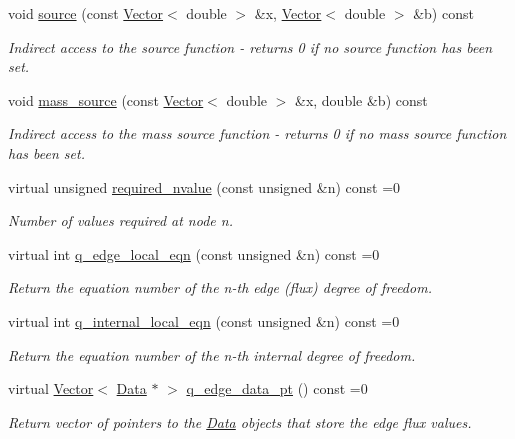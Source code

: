 \begin{DoxyCompactItemize}
void \hyperlink{classoomph_1_1DarcyEquations_aca046624f129486cc4ced6a2c056a53c}{source} (const \hyperlink{classoomph_1_1Vector}{Vector}$<$ double $>$ \&x, \hyperlink{classoomph_1_1Vector}{Vector}$<$ double $>$ \&b) const
\begin{DoxyCompactList}\small\item\em Indirect access to the source function -\/ returns 0 if no source function has been set. \end{DoxyCompactList}\item 
void \hyperlink{classoomph_1_1DarcyEquations_ae1074a981107175c6b5344003cb1fb85}{mass\+\_\+source} (const \hyperlink{classoomph_1_1Vector}{Vector}$<$ double $>$ \&x, double \&b) const
\begin{DoxyCompactList}\small\item\em Indirect access to the mass source function -\/ returns 0 if no mass source function has been set. \end{DoxyCompactList}\item 
virtual unsigned \hyperlink{classoomph_1_1DarcyEquations_a05d86d0d0568c5f90e6d735730798571}{required\+\_\+nvalue} (const unsigned \&n) const =0
\begin{DoxyCompactList}\small\item\em Number of values required at node n. \end{DoxyCompactList}\item 
virtual int \hyperlink{classoomph_1_1DarcyEquations_a559ad66d750c27f54ad342f0c8815e74}{q\+\_\+edge\+\_\+local\+\_\+eqn} (const unsigned \&n) const =0
\begin{DoxyCompactList}\small\item\em Return the equation number of the n-\/th edge (flux) degree of freedom. \end{DoxyCompactList}\item 
virtual int \hyperlink{classoomph_1_1DarcyEquations_a17e99902b01ea42312fa6148a796255f}{q\+\_\+internal\+\_\+local\+\_\+eqn} (const unsigned \&n) const =0
\begin{DoxyCompactList}\small\item\em Return the equation number of the n-\/th internal degree of freedom. \end{DoxyCompactList}\item 
virtual \hyperlink{classoomph_1_1Vector}{Vector}$<$ \hyperlink{classoomph_1_1Data}{Data} $\ast$ $>$ \hyperlink{classoomph_1_1DarcyEquations_acc843eea2fff3da96cd213afbff0f6e3}{q\+\_\+edge\+\_\+data\+\_\+pt} () const =0
\begin{DoxyCompactList}\small\item\em Return vector of pointers to the \hyperlink{classoomph_1_1Data}{Data} objects that store the edge flux values. \end{DoxyCompactList}\item 

\end{DoxyCompactItemize}
